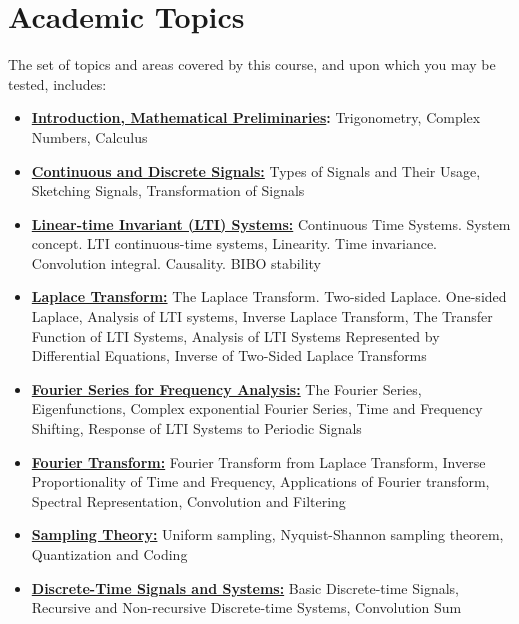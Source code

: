 \documentclass[11pt]{report}
\begin{document}
\section*{Academic Topics}
The set of topics and areas covered by this course, and upon which you may be tested, includes:
\begin{itemize}
    \item \textbf{\textcolor{winemaroon}{\underline{Introduction, Mathematical Preliminaries}:}} Trigonometry, Complex Numbers, Calculus

    \item \textbf{\textcolor{coral!85!black}{\underline{Continuous and Discrete Signals:}}} Types of Signals and Their Usage, Sketching Signals, Transformation of Signals

    \item \textbf{\textcolor{winemaroon}{\underline{Linear-time Invariant (LTI) Systems:}}} Continuous Time Systems. System concept. LTI continuous-time systems, Linearity. Time invariance. Convolution integral. Causality. BIBO stability

    \item \textbf{\textcolor{coral!85!black}{\underline{Laplace Transform:}}} The Laplace Transform. Two-sided Laplace. One-sided Laplace, Analysis of LTI systems, Inverse Laplace Transform, The Transfer Function of LTI Systems, Analysis of LTI Systems Represented by Differential Equations, Inverse of Two-Sided Laplace Transforms

    \item \textbf{\textcolor{winemaroon}{\underline{Fourier Series for Frequency Analysis:}}} The Fourier Series, Eigenfunctions, Complex exponential Fourier Series, Time and Frequency Shifting, Response of LTI Systems to Periodic Signals

    \item \textbf{\textcolor{coral!85!black}{\underline{Fourier Transform:}}} Fourier Transform from Laplace Transform, Inverse Proportionality of Time and Frequency, Applications of Fourier transform, Spectral Representation, Convolution and Filtering

    \item \textbf{\textcolor{winemaroon}{\underline{Sampling Theory:}}} Uniform sampling, Nyquist-Shannon sampling theorem, Quantization and Coding

    \item \textbf{\textcolor{coral!85!black}{\underline{Discrete-Time Signals and Systems:}}} Basic Discrete-time Signals, Recursive and Non-recursive Discrete-time Systems, Convolution Sum


\end{itemize}
\end{document}
